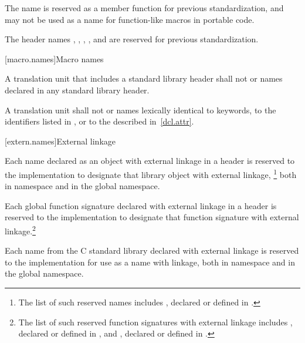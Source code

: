 \pnum
The name   is reserved as a
member function for previous standardization, and may not be used as a name for
function-like macros in portable code.

\pnum
The header names , , ,
, and  are reserved for previous standardization.

[macro.names]{Macro names}

\pnum
{}%
%
A translation unit that includes a standard library header shall not
 or  names declared in any standard
library header.

\pnum
{}%
A translation unit shall not  or 
names lexically identical to keywords, to the identifiers listed in
, or to the  described
in~\ref{dcl.attr}.

[extern.names]{External linkage}

\pnum
Each name declared as an object with external linkage
%
in a header is reserved to the implementation to designate that library
object with external linkage,%
\footnote{The list of such reserved names includes
,
declared or defined in
%
.}
both in namespace
and in the global namespace.

\pnum
Each
%
global function signature declared with
%
external linkage in a header is reserved to the
implementation to designate that function signature with
%
external linkage.\footnote{The list of such reserved function
signatures with external linkage includes
%
,
declared or defined in
%
,
and
%
%
,
declared or defined in
%
.}

\pnum
Each name from the C standard library declared with external linkage
%
is reserved to the implementation for use as a name with
%
%
linkage,
both in namespace  and in the global namespace.

